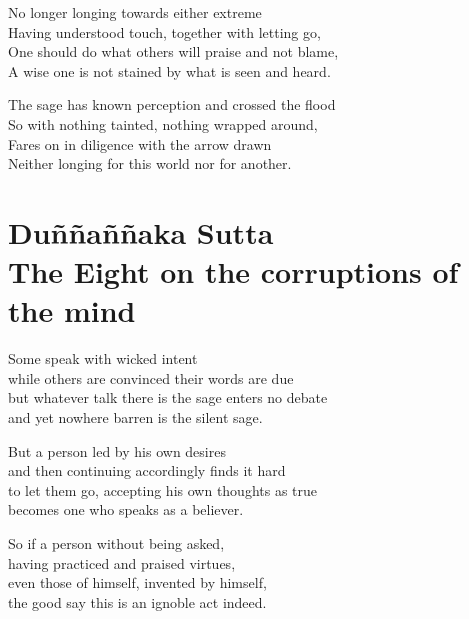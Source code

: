 \begin{MyDescription}{}
No longer longing towards either extreme\\
Having understood touch, together with letting go,\\
One should do what others will praise and not blame,\\
A wise one is not stained by what is seen and heard.
\end{MyDescription}

\begin{MyDescription}{}
The sage has known perception and crossed the flood\\
So with nothing tainted, nothing wrapped around,\\
Fares on in diligence with the arrow drawn\\
Neither longing for this world nor for another.
\end{MyDescription}

\begin{MyDescription}[(Sn. 772-779)]{}

\end{MyDescription}

\chapter{Du\~n\~na\~n\~naka Sutta\\ The Eight on the corruptions of the mind}

\begin{MyDescription}{}
Some speak with wicked intent\\
while others are convinced their words are due\\
but whatever talk there is the sage enters no debate\\
and yet nowhere barren is the silent sage.
\end{MyDescription}

\begin{MyDescription}{}
But a person led by his own desires\\
and then continuing accordingly finds it hard\\
to let them go, accepting his own thoughts as true\\
becomes one who speaks as a believer.
\end{MyDescription}

\begin{MyDescription}{}
So if a person without being asked,\\
having practiced and praised virtues,\\
even those of himself, invented by himself,\\
the good say this is an ignoble act indeed.
\end{MyDescription}

